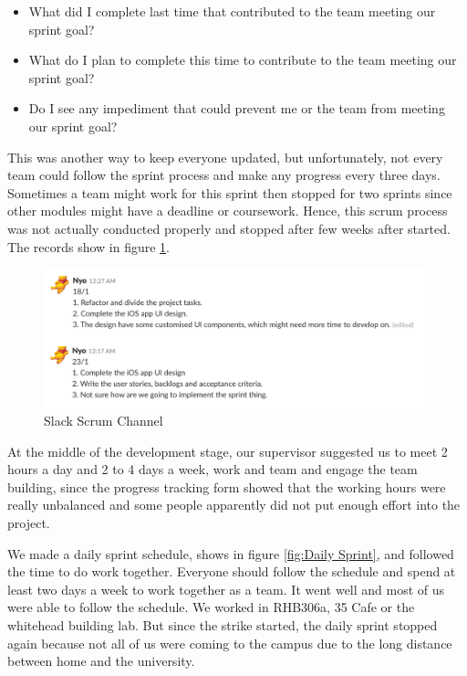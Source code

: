 \documentclass[12pt,a4paper]{article}
\begin{document}
          \begin{itemize}
            \item What did I complete last time that contributed to the team meeting our sprint goal?
            \item What do I plan to complete this time to contribute to the team meeting our sprint goal?
            \item Do I see any impediment that could prevent me or the team from meeting our sprint goal?
          \end{itemize}    

          This was another way to keep everyone updated, but unfortunately, not every team could follow the sprint process and make any progress every three days. Sometimes a team might work for this sprint then stopped for two sprints since other modules might have a deadline or coursework. Hence, this scrum process was not actually conducted properly and stopped after few weeks after started. The records show in figure \ref{fig:Slack Scrum Channel}. 

          \begin{figure}[H]
            \centering
            \includegraphics[width=1\textwidth]{../assets/development-records-slack-scrum-channel.png}
            \caption{Slack Scrum Channel}
            \label{fig:Slack Scrum Channel}
          \end{figure}
          
          At the middle of the development stage, our supervisor suggested us to meet 2 hours a day and 2 to 4 days a week, work and team and engage the team building, since the progress tracking form showed that the working hours were really unbalanced and some people apparently did not put enough effort into the project. 
          
          We made a daily sprint schedule, shows in figure \ref{fig:Daily Sprint}, and followed the time to do work together. Everyone should follow the schedule and spend at least two days a week to work together as a team. It went well and most of us were able to follow the schedule. We worked in RHB306a, 35 Cafe or the whitehead building lab. But since the strike started, the daily sprint stopped again because not all of us were coming to the campus due to the long distance between home and the university. 
\end{document}
